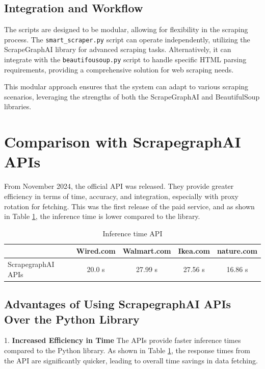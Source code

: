 \subsection{Integration and Workflow}

The scripts are designed to be modular, allowing for flexibility in the scraping process. The \texttt{smart\_scraper.py} script can operate independently, utilizing the ScrapeGraphAI library for advanced scraping tasks. Alternatively, it can integrate with the \texttt{beautifousoup.py} script to handle specific HTML parsing requirements, providing a comprehensive solution for web scraping needs.

This modular approach ensures that the system can adapt to various scraping scenarios, leveraging the strengths of both the ScrapeGraphAI and BeautifulSoup libraries.

\section{Comparison with ScrapegraphAI APIs}
From November 2024, the official API was released. They provide greater efficiency in terms of time, accuracy, and integration, especially with proxy rotation for fetching. This was the first release of the paid service, and as shown in Table \ref{tab:comparison}, the inference time is lower compared to the library.

\begin{table}[h!]
\centering
\begin{tabular}{|l|c|c|c|c|}
\hline
                & Wired.com & Walmart.com & Ikea.com & nature.com \\ \hline
ScrapegraphAI APIs   &    20.0 s      &  27.99 s    &  27.56 s & 16.86 s            \\ \hline
\end{tabular}
\caption{Inference time API}
\label{tab:comparison}
\end{table}

\newpage

\subsection{Advantages of Using ScrapegraphAI APIs Over the Python Library}

1. \textbf{Increased Efficiency in Time}  
   The APIs provide faster inference times compared to the Python library. As shown in Table \ref{tab:comparison}, the response times from the API are significantly quicker, leading to overall time savings in data fetching.


